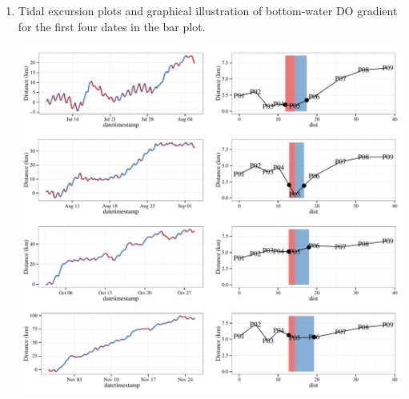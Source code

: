 \documentclass[letterpaper,12pt]{article}\usepackage[]{graphicx}\usepackage[]{color}
\begin{document}
\begin{enumerate}
{{}



}
\item{
Tidal excursion plots and graphical illustration of bottom-water DO gradient for the first four dates in the bar plot. 


{\centering \includegraphics[width=\textwidth]{figs/unnamed-chunk-9-1} 

}




}
\end{enumerate}
\end{document}
